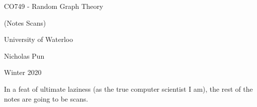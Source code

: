 \documentclass[12pt]{article}
\newcommand{\includelecture}[1]{
  
  
  \clearpage
}
\begin{document}
\begin{titlepage}
  \centering
  \vspace*{2in}
  {\huge CO749 - Random Graph Theory}\par
  {\Large (Notes Scans)}\par
  \vspace{0.3in}
  {\large University of Waterloo}\par
  {\large Nicholas Pun}\par
  {\large Winter 2020}\par 
\end{titlepage}
 
\tableofcontents
\clearpage

\clearpage
\clearpage
\clearpage
\clearpage
\clearpage

In a feat of ultimate laziness (as the true computer scientist I am), the rest of the notes are going to be scans.

\includelecture{sections/lec6.pdf}
\includelecture{sections/lec7.pdf}
\includelecture{sections/lec8.pdf}
\includelecture{sections/lec9.pdf}
\includelecture{sections/lec10.pdf}
\includelecture{sections/lec11.pdf}
\includelecture{sections/lec12.pdf}
\includelecture{sections/lec13.pdf}
\includelecture{sections/lec14.pdf}
\includelecture{sections/lec15.pdf}
\includelecture{sections/lec16.pdf}

\nocite{*}


\end{document}
